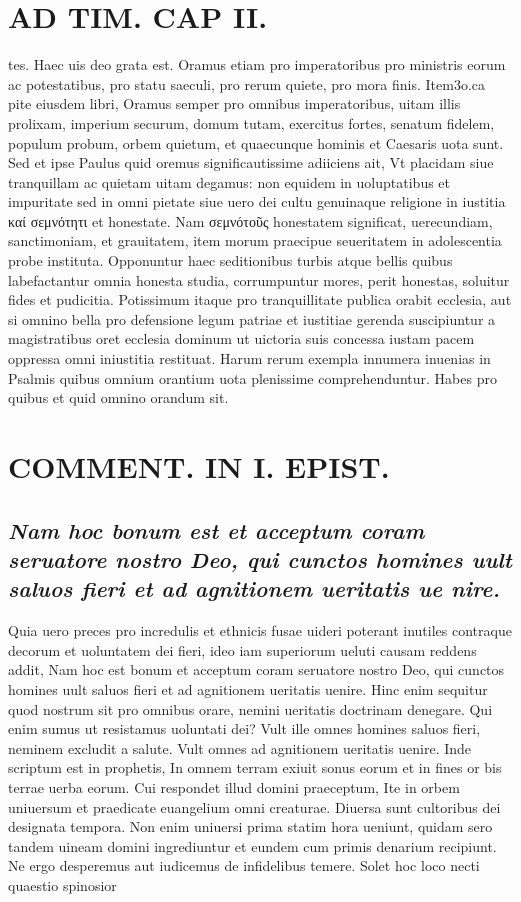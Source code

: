 \documentclass{article}
\begin{document}
\begin{pages}
\section*{AD TIM. CAP II. }
\marginpar{[ p.112 ]}\pstart tes. Haec uis deo grata est. Oramus etiam pro imperatoribus pro ministris eorum ac potestatibus, pro statu saeculi, pro rerum quiete, pro mora finis. Item3o.ca pite eiusdem libri, Oramus semper pro omnibus imperatoribus, uitam illis prolixam, imperium securum, domum tutam, exercitus fortes, senatum fidelem, populum probum, orbem quietum, et quaecunque hominis et Caesaris uota sunt. Sed et ipse Paulus quid oremus significautissime adiiciens ait, Vt placidam siue tranquillam ac quietam uitam degamus: non equidem in uoluptatibus et impuritate sed in omni pietate siue uero dei cultu genuinaque religione in iustitia καί σεμνότητι et honestate. Nam σεμνότοῦς honestatem significat, uerecundiam, sanctimoniam, et grauitatem, item morum praecipue seueritatem in adolescentia probe instituta. Opponuntur haec seditionibus turbis atque bellis quibus labefactantur omnia honesta studia, corrumpuntur mores, perit honestas, soluitur fides et pudicitia. Potissimum itaque pro tranquillitate publica orabit ecclesia, aut si omnino bella pro defensione legum patriae et iustitiae gerenda suscipiuntur a magistratibus oret ecclesia dominum ut uictoria suis concessa iustam pacem oppressa omni iniustitia restituat. Harum rerum exempla innumera inuenias in Psalmis quibus omnium orantium uota plenissime comprehenduntur. Habes pro quibus et quid omnino orandum sit.  \pend
\section*{COMMENT. IN I. EPIST. } 
{}
\subsection*{\textit{Nam hoc bonum est et acceptum coram seruatore nostro Deo, qui cunctos homines uult saluos fieri et ad agnitionem ueritatis ue nire. }}\pstart Quia uero preces pro incredulis et ethnicis fusae uideri poterant inutiles contraque decorum et uoluntatem dei fieri, ideo iam superiorum ueluti causam reddens addit, Nam hoc est bonum et acceptum coram seruatore nostro Deo, qui cunctos homines uult saluos fieri et ad agnitionem ueritatis uenire. Hinc enim sequitur quod nostrum sit pro omnibus orare, nemini ueritatis doctrinam denegare. Qui enim sumus ut resistamus uoluntati dei? Vult ille omnes homines saluos fieri, neminem excludit a salute. Vult omnes ad agnitionem ueritatis uenire. Inde scriptum est in prophetis, In omnem terram exiuit sonus eorum et in fines or bis terrae uerba eorum. Cui respondet illud domini praeceptum, Ite in orbem uniuersum et praedicate euangelium omni creaturae. Diuersa sunt cultoribus dei designata tempora. Non enim uniuersi prima statim hora ueniunt, quidam sero tandem uineam domini ingrediuntur et eundem cum primis denarium recipiunt. Ne ergo desperemus aut iudicemus de infidelibus temere. Solet hoc loco necti quaestio spinosior  \pend

\end{pages}
\end{document}
